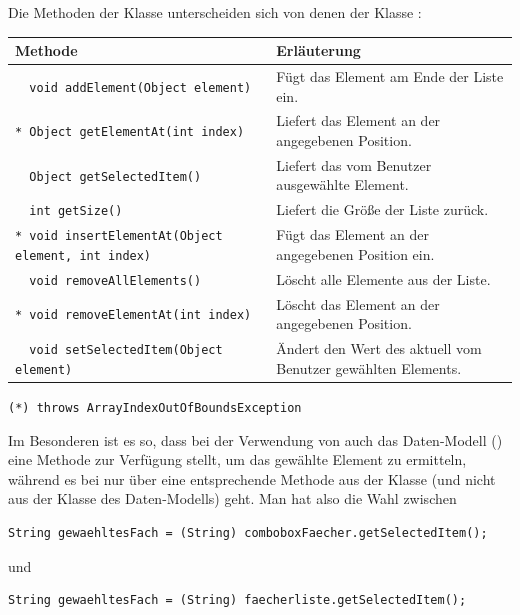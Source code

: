 Die Methoden der Klasse  unterscheiden sich von
denen der Klasse :

\bgroup
\def\arraystretch{1.2}
\begin{tabularx}{\textwidth}{|p{90mm}|X|}
\hline
\textbf{Methode} & \textbf{Erläuterung}
\\ \hline
\lstinline|  void addElement(Object element)| & 
Fügt das Element am Ende der Liste ein.
\\ \hline
\lstinline|* Object getElementAt(int index)| &
Liefert das Element an der angegebenen Position.
\\ \hline
\lstinline|  Object getSelectedItem()| &
Liefert das vom Benutzer ausgewählte Element.
\\ \hline
\lstinline|  int getSize()| &
Liefert die Größe der Liste zurück.
\\ \hline
\lstinline|* void insertElementAt(Object element, int index)| &
Fügt das Element an der angegebenen Position ein.
\\ \hline
\lstinline|  void removeAllElements()| & 
Löscht alle Elemente aus der Liste.
\\ \hline
\lstinline|* void removeElementAt(int index)| & 
Löscht das Element an der angegebenen Position.
\\ \hline
\lstinline|  void setSelectedItem(Object element)| & 
Ändert den Wert des aktuell vom Benutzer gewählten Elements. 
\\ \hline
\end{tabularx}
\egroup

\lstinline|(*) throws ArrayIndexOutOfBoundsException| 

Im Besonderen ist es so, dass bei der Verwendung von  auch
das Daten-Modell () eine Methode zur Verfügung
stellt, um das gewählte Element zu ermitteln, während es bei  nur
über eine entsprechende Methode aus der Klasse  (und nicht aus
der Klasse des Daten-Modells) geht. Man hat also die Wahl zwischen

\begin{lstlisting}
String gewaehltesFach = (String) comboboxFaecher.getSelectedItem();
\end{lstlisting}

und

\begin{lstlisting}
String gewaehltesFach = (String) faecherliste.getSelectedItem();
\end{lstlisting}
